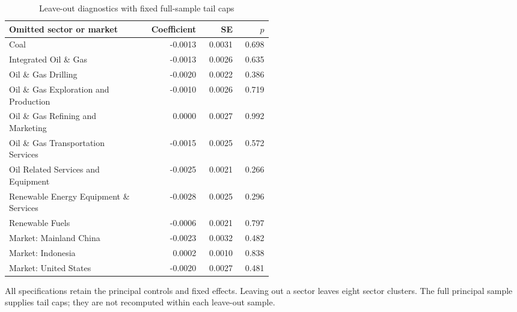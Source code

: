 \begin{table}[htbp]
\centering
\caption{Leave-out diagnostics with fixed full-sample tail caps}
\label{tab:leaveout}
\begin{minipage}{\linewidth}
\footnotesize
\setlength{\tabcolsep}{4pt}
\begingroup\centering
\begin{tabular}{p{0.51\linewidth}rrr}
\toprule
Omitted sector or market & Coefficient & SE & $p$ \\
\midrule
Coal & -0.0013 & 0.0031 & 0.698 \\
Integrated Oil \& Gas & -0.0013 & 0.0026 & 0.635 \\
Oil \& Gas Drilling & -0.0020 & 0.0022 & 0.386 \\
Oil \& Gas Exploration and Production & -0.0010 & 0.0026 & 0.719 \\
Oil \& Gas Refining and Marketing & 0.0000 & 0.0027 & 0.992 \\
Oil \& Gas Transportation Services & -0.0015 & 0.0025 & 0.572 \\
Oil Related Services and Equipment & -0.0025 & 0.0021 & 0.266 \\
Renewable Energy Equipment \& Services & -0.0028 & 0.0025 & 0.296 \\
Renewable Fuels & -0.0006 & 0.0021 & 0.797 \\
Market: Mainland China & -0.0023 & 0.0032 & 0.482 \\
Market: Indonesia & 0.0002 & 0.0010 & 0.838 \\
Market: United States & -0.0020 & 0.0027 & 0.481 \\
\bottomrule
\end{tabular}\par\endgroup
\par\vspace{0.5em}\footnotesize All specifications retain the principal controls and fixed effects. Leaving out a sector leaves eight sector clusters. The full principal sample supplies tail caps; they are not recomputed within each leave-out sample.
\end{minipage}
\end{table}
